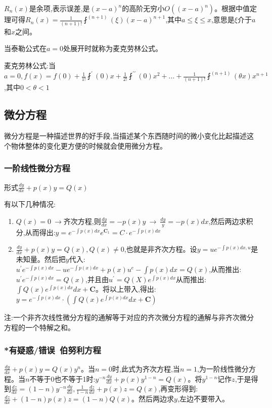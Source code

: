 \documentclass[UTF8]{ctexbook}
\newcommand{\derivative}{^\prime}
\newcommand{\doubleDerivative}{^{\prime\prime}}
\newcommand{\aLotDerivative}[1]{^{(#1)}}
\newcommand{\fDerivative}[1]{\fint\derivative(#1)}
\newcommand{\defFunction}[1]{f(#1)}
\newcommand{\mathConstant}{\mathbf{C}}
\begin{document}
{{{{$R_n(x)$是余项,表示误差,是$(x - a)^n$的高阶无穷小$O((x - a)^n)$。根据中值定理可得$R_n(x) = \frac{1}{(n + 1)!}\fint\aLotDerivative{n + 1}(\xi)(x - a)^{n+1}$,其中$a \leq \xi \leq x$,意思是$\xi$介于$a$和$x$之间。

当泰勒公式在$a = 0$处展开时就称为麦克劳林公式。

麦克劳林公式:当$a = 0, \defFunction{x} = \defFunction{0} + \frac{1}{1!}\fDerivative{0}x + \frac{1}{2!}\fint\doubleDerivative(0)x^2 + ... + \frac{1}{(n + 1)!}\fint\aLotDerivative{n + 1}(\theta x)x^{n+1}$,其中$0 < \theta < 1$

}%

}%

\subsection{微分方程}{
微分方程是一种描述世界的好手段,当描述某个东西随时间的微小变化比起描述这个物体整体的变化更方便的时候就会使用微分方程。

\subsubsection{一阶线性微分方程}{
  形式$\frac{dy}{dx} + p(x)y = Q(x)$

  有以下几种情况:
  \begin{enumerate}
    \item $Q(x) = 0\ \to$齐次方程,则$\frac{dy}{dx} = -p(x)y\ \to \ \frac{dy}{y} = -p(x)dx$,然后两边求积分,从而得出:$y = e^{-\int p(x)dx}e^{\mathConstant_1} = C \cdot e^{-\int p(x)dx}$
    \item $\frac{dy}{dx} + p(x)y = Q(x), Q(x) \neq 0$,也就是非齐次方程。设$y = ue^{-\int p(x)dx, u}$是未知量。然后把$y$代入:\\ $u\derivative e^{-\int p(x)dx} - ue^{-\int p(x)dx} + p(x)u^{e}-\int p(x)dx = Q(x)$,从而推出:$u\derivative e^{-\int p(x)dx} = Q(x)$,并且由$u\derivative = Q(X)e^{\int p(x)dx}$从而推出:$\int Q(x)e^{\int p(x)dx}dx + \mathConstant$。将以上带入,得出:$y = e^{-\int p(x)dx}\cdot(\int Q(x)e^{\int p(x)dx}dx + \mathConstant)$
  \end{enumerate}

  注:一个非齐次线性微分方程的通解等于对应的齐次微分方程的通解与非齐次微分方程的一个特解之和。

}%

\subsubsection{*有疑惑/错误\ 伯努利方程}{
  $\frac{dy}{dx} + p(x)y = Q(x)y^n$。当$n = 0$时,此式为齐次方程,当$n = 1$,为一阶线性微分方程。当$n$不等于0也不等于1时:$y^{-n}\frac{dy}{dx} + p(x)y^{1-n} = Q(x)$。将$y^{1-n}$记作$z$,于是得到$\frac{dz}{dx} = (1-n)y^{-n}\frac{dy}{dx},\frac{1}{1-n}\frac{dz}{dx} + p(x)z = Q(x)$,再变形得到:$\frac{dz}{dx} + (1-n)p(x)z = (1-n)Q(x)$。然后两边求$y$,左边不要带入。

}}}}
\end{document}
